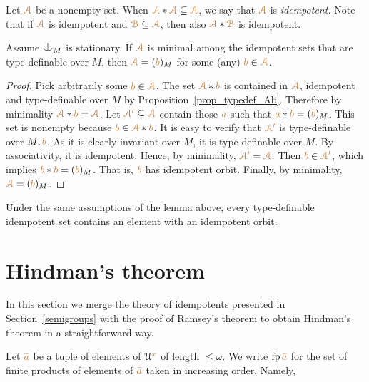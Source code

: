 Let ${\color{brown}\EuScript A}$ be a nonempty set.
When ${\color{brown}\EuScript A}*{\color{brown}\EuScript A}\subseteq{\color{brown}\EuScript A}$, we say that ${\color{brown}\EuScript A}$ is \emph{idempotent.}
Note that if  ${\color{brown}\EuScript A}$ is idempotent and ${\color{brown}\EuScript B}\subseteq{\color{brown}\EuScript A}$, then also ${\color{brown}\EuScript A}*{\color{brown}\EuScript B}$ is idempotent.

\begin{lemma}\label{lem_Hindman}
Assume $\cnonfork_M$ is stationary.
If ${\color{brown}\EuScript A}$ is minimal among the
idempotent sets that are
type-definable over $M$, then ${\color{brown}\EuScript A}=({\color{brown} b})_M$ for some (any) ${\color{brown} b}\in{\color{brown}\EuScript A}$.
\end{lemma}

\begin{proof}
Pick arbitrarily some ${\color{brown} b}\in{\color{brown}\EuScript A}$.
%
The set ${\color{brown}\EuScript A}*{\color{brown} b}$ is contained in ${\color{brown}\EuScript A}$, idempotent and 
type-definable over $M$ by Proposition~\ref{prop_typedef_Ab}.
%
Therefore by minimality ${\color{brown}\EuScript A}*{\color{brown} b}={\color{brown}\EuScript A}$.
%
Let ${\color{brown}\EuScript A'}\subseteq{\color{brown}\EuScript A}$ contain those ${\color{brown} a}$ such that 
${\color{brown} a}*{\color{brown} b}=({\color{brown} b})_M$.
%
This set is nonempty because ${\color{brown} b}\in{\color{brown}\EuScript A}*{\color{brown} b}$.
%
It is easy to verify that ${\color{brown}\EuScript A'}$ is type-definable over $M,{\color{brown} b}$.
%
As it is clearly invariant over $M$, it is type-definable over $M$.
%
By associativity, it is idempotent.
%
Hence, by minimality, ${\color{brown}\EuScript A'}={\color{brown}\EuScript A}$.
%
Then ${\color{brown} b}\in{\color{brown}\EuScript A'}$, which implies ${\color{brown} b}*{\color{brown} b}=({\color{brown} b})_M$.
%
That is, ${\color{brown} b}$ has idempotent orbit.
%
Finally, by minimality, ${\color{brown}\EuScript A}=({\color{brown} b})_M$.
\end{proof}

\begin{corollary}\label{corol_idempotent}
Under the same assumptions of the lemma above, every type-definable 
idempotent set contains an element with an idempotent orbit.
\end{corollary}

\section{Hindman's theorem}\label{Hindman}

In this section we merge the theory of idempotents presented in Section~\ref{semigroups}
with the proof of Ramsey's theorem to obtain Hindman's theorem in a straightforward way.

Let ${\color{brown}\bar a}$ be a tuple of elements of $\EuScript U^{\color{brown} x}$ of length $\le\omega$.
We write ${\rm fp}\,{\color{brown}\bar a}$ for the set of finite products of elements 
of ${\color{brown}\bar a}$ taken in increasing order. 
Namely, 

